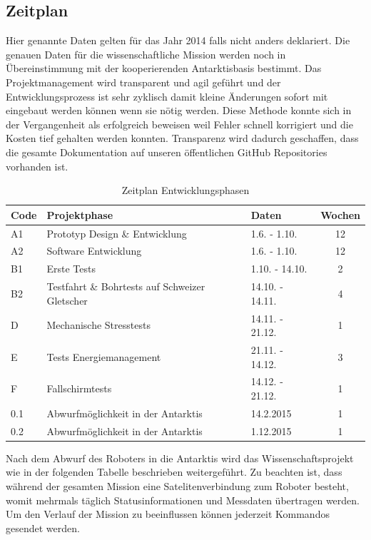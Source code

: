 \documentclass[a4paper,12pt]{article}
\begin{document}
\subsection{Zeitplan}

Hier genannte Daten gelten für das Jahr 2014 falls nicht anders deklariert. Die genauen Daten für die wissenschaftliche Mission werden noch in Übereinstimmung mit der kooperierenden Antarktisbasis bestimmt. Das Projektmanagement wird transparent und agil geführt und der Entwicklungsprozess ist sehr zyklisch damit kleine Änderungen sofort mit eingebaut werden können wenn sie nötig werden. Diese Methode konnte sich in der Vergangenheit als erfolgreich beweisen weil Fehler schnell korrigiert und die Kosten tief gehalten werden konnten. Transparenz wird dadurch geschaffen, dass die gesamte Dokumentation auf unseren öffentlichen GitHub \cite{octanisgithub} Repositories vorhanden ist.

\begin{table}[h!]
\centering
\begin{tabular}{ l | l | l | c }

\bfseries{Code} & \bfseries{Projektphase} & \bfseries{Daten} & \bfseries{Wochen} \\
\hline
A1 & Prototyp Design \& Entwicklung & 1.6. - 1.10. & 12 \\
A2 & Software Entwicklung & 1.6. - 1.10. & 12 \\
B1 & Erste Tests & 1.10. - 14.10. & 2  \\
B2 & Testfahrt \& Bohrtests auf Schweizer Gletscher & 14.10. - 14.11. & 4 \\
D & Mechanische Stresstests & 14.11. - 21.12. & 1 \\
E & Tests Energiemanagement & 21.11. - 14.12. & 3 \\
F & Fallschirmtests & 14.12. - 21.12. & 1 \\
0.1 & Abwurfmöglichkeit in der Antarktis & 14.2.2015 &  1 \\
0.2 & Abwurfmöglichkeit in der Antarktis & 1.12.2015 &  1 \\

\end{tabular}
\caption{Zeitplan Entwicklungsphasen}
\end{table}

Nach dem Abwurf des Roboters in die Antarktis wird das Wissenschaftsprojekt wie in der folgenden Tabelle beschrieben weitergeführt. Zu beachten ist, dass während der gesamten Mission eine Satelitenverbindung zum Roboter besteht, womit mehrmals täglich Statusinformationen und Messdaten übertragen werden. Um den Verlauf der Mission zu beeinflussen können jederzeit Kommandos gesendet werden.
\end{document}

